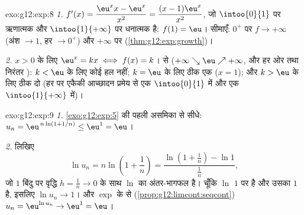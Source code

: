 \begin{solution}{exo:g12:exp:8}
\emph{1.} $f'(x) = \dfrac{\eu^x x - \eu^x}{x^2} = \dfrac{(x-1)\eu^x}{x^2}$, जो $\intoo{0}{1}$ पर ऋणात्मक और $\intoo{1}{+\infty}$ पर धनात्मक है:  $f(1) = \eu$।
सीमाएँ: $0^+$ पर $f \to +\infty$ (अंश $\to 1$, हर $\to 0^+$) और $+\infty$ पर (\cref{thm:g12:exp:growth})।

\emph{2.} $x > 0$ के लिए $\eu^x = kx \iff f(x) = k$।  से ($+\infty \searrow \eu \nearrow +\infty$, और हर ओर  तथा
निरंतर ): $k < \eu$ के लिए कोई हल नहीं; $k = \eu$ के लिए ठीक एक ($x = 1$); और
$k > \eu$ के लिए ठीक दो (हर  पर एकैकी आच्छादन प्रमेय से एक $\intoo{0}{1}$ में और एक
$\intoo{1}{+\infty}$ में)।
\end{solution}

\begin{solution}{exo:g12:exp:9}
\emph{1.} \cref{exo:g12:exp:5} की पहली असमिका से सीधे: $u_n = \eu^{\,n\ln(1+1/n)} \leq \eu^1 = \eu$।

\emph{2.} लिखिए
\[
\ln u_n = n \ln\!\left(1 + \frac1n\right)
= \frac{\ln\!\left(1 + \frac1n\right) - \ln 1}{\frac1n},
\]
जो $1$ बिंदु पर वृद्धि $h = \frac1n \to 0$ के साथ $\ln$ का अंतर-भागफल है। चूँकि $\ln$
$1$ पर  है और उसका  $1$ है, इसलिए $\ln u_n \to 1$। और $\exp$ के 
से (\cref{prop:g12:limcont:seqcont}) $u_n = \eu^{\ln u_n} \to \eu^1 = \eu$।
\end{solution}

